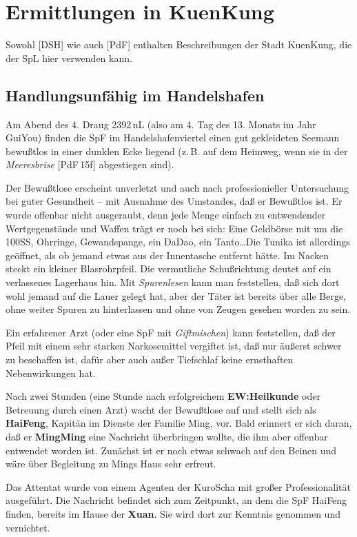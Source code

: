 \documentclass[
a4paper,
twoside,
DIV=calc,
BCOR=4mm,
fontsize=9pt,
twocolumn=on,
titlepage=on,
parskip=half
]{scrartcl}
\begin{document}
\section{Ermittlungen in KuenKung}

Sowohl [DSH] wie auch [PdF] enthalten Beschreibungen der Stadt
KuenKung, die der SpL hier verwenden kann.

\subsection{Handlungsunfähig im Handelshafen}

Am Abend des 4. Draug 2392\,nL (also am 4. Tag des 13. Monats im Jahr
GuiYou) finden die SpF im Handelshafenviertel einen gut gekleideten
Seemann bewußtlos in einer dunklen Ecke liegend (z.\,B. auf dem
Heimweg, wenn sie in der \emph{Meeresbrise} [PdF\,15f] abgestiegen
sind).

Der Bewußtlose erscheint unverletzt und auch nach professionieller
Untersuchung bei guter Gesundheit -- mit Ausnahme des Umstandes, daß
er Bewußtlos ist. Er wurde offenbar nicht ausgeraubt, denn jede Menge
einfach zu entwendender Wertgegenstände und Waffen trägt er noch bei
sich: Eine Geldbörse mit um die 100SS, Ohrringe, Gewandspange, ein
DaDao, ein Tanto\dots Die Tunika ist allerdings geöffnet, als ob
jemand etwas aus der Innentasche entfernt hätte. Im Nacken steckt ein
kleiner Blasrohrpfeil.  Die vermutliche Schußrichtung deutet auf ein
verlassenes Lagerhaus hin. Mit \emph{Spurenlesen} kann man
feststellen, daß sich dort wohl jemand auf die Lauer gelegt hat, aber
der Täter ist bereits über alle Berge, ohne weiter Spuren zu
hinterlassen und ohne von Zeugen gesehen worden zu sein.

Ein erfahrener Arzt (oder eine SpF mit \emph{Giftmischen}) kann
feststellen, daß der Pfeil mit einem sehr starken Narkosemittel
vergiftet ist, daß nur äußerst schwer zu beschaffen ist, dafür aber
auch außer Tiefschlaf keine ernsthaften Nebenwirkungen hat.

Nach zwei Stunden (eine Stunde nach erfolgreichem
\textbf{EW:Heilkunde} oder Betreuung durch einen Arzt) wacht der
Bewußtlose auf und stellt sich als \textbf{HaiFeng}, Kapitän im
Dienste der Familie Ming, vor. Bald erinnert er sich daran, daß er
\textbf{MingMing} eine Nachricht überbringen wollte, die ihm aber
offenbar entwendet worden ist. Zunächst ist er noch etwas schwach auf
den Beinen und wäre über Begleitung zu Mings Haus sehr erfreut.

Das Attentat wurde von einem Agenten der KuroScha mit großer
Professionalität ausgeführt. Die Nachricht befindet sich zum
Zeitpunkt, an dem die SpF HaiFeng finden, bereits im Hause der
\textbf{Xuan}. Sie wird dort zur Kenntnis genommen und vernichtet.
\end{document}

